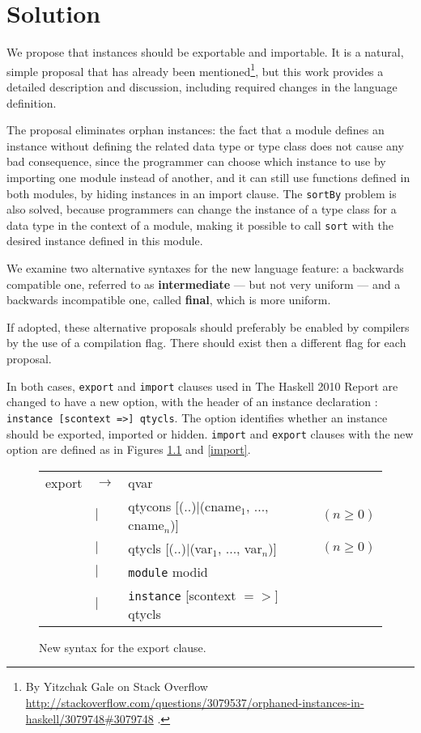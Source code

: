 \documentclass[msc]{ppgccufmg}
\begin{document}
\chapter{Solution}


We propose that instances should be exportable and importable.  It is a natural, simple proposal that has already
been mentioned\footnote{By Yitzchak Gale on Stack Overflow
  \url{http://stackoverflow.com/questions/3079537/orphaned-instances-in-haskell/3079748\#3079748}
  .}, but this work provides a detailed description and discussion,
including required changes in the language definition.

The proposal eliminates orphan
instances: the fact that a module defines an instance without
defining the related data type or type class does not cause any bad
consequence, since the programmer can choose which instance to use
by importing one module instead of another, and it can still use
functions defined in both modules, by hiding instances in an import
clause.  The \texttt{sortBy} problem is also solved, because
programmers can change the instance of a type class for a data type in
the context of a module, making it possible to call \texttt{sort} with
the desired instance defined in this module.

We examine two alternative syntaxes for the new language feature: a
backwards compatible one, referred to as \textbf{intermediate} --- but
not very uniform --- and a backwards incompatible one, called
\textbf{final}, which is more uniform.

If adopted, these alternative proposals should
preferably be enabled by compilers by the use of a compilation flag.  There
should exist then a different flag for each proposal.

In both cases, \texttt{export} and \texttt{import} clauses used in
The Haskell 2010 Report \citep[sections 5.2 and 5.3]{report} are
changed to have a new option, with the header of
an instance declaration \citep[section~4.3.2]{report}: \texttt{instance
  [scontext =>] qtycls}.  The option identifies whether an instance should be
exported, imported or hidden.  \texttt{import} and \texttt{export} clauses with the new option are defined as in
Figures \ref{export} and \ref{import}.

\begin{figure}
\caption{New syntax for the export clause.\label{export}}
\begin{tabular}{|l l l l|}
\hline
export & $\to$ & qvar &\\
& $|$ & qtycons [(..)$|$(cname$_1$, ..., cname$_n$)] & $(n \geq 0)$\\
& $|$ & qtycls [(..)$|$(var$_1$, ..., var$_n$)] & $(n \geq 0)$\\
& $|$ & \texttt{module} modid &\\
& $|$ & \texttt{instance} [scontext $=>$] qtycls &\\
\hline
\end{tabular}
\end{figure}
\end{document}
